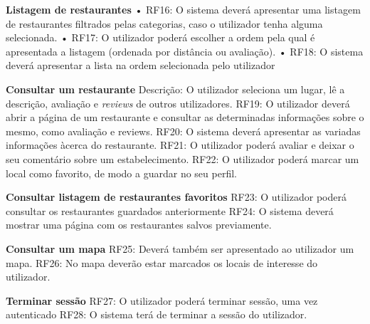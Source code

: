 \documentclass[a4paper,12pt]{scrreprt}
\begin{document}
            \textbf{Listagem de restaurantes} \newline
            • RF16: O sistema deverá apresentar uma listagem de restaurantes filtrados pelas categorias, caso o utilizador tenha alguma selecionada. \newline
            • RF17: O utilizador poderá escolher a ordem pela qual é apresentada a listagem (ordenada por distância ou avaliação).\newline
            • RF18: O sistema deverá apresentar a lista na ordem selecionada pelo utilizador
            
            \textbf{Consultar um restaurante}\newline
            Descrição: O utilizador seleciona um lugar, lê a descrição, avaliação e \textit{reviews} de outros utilizadores. \newline
            RF19: O utilizador deverá abrir a página de um restaurante e consultar as determinadas informações sobre o mesmo, como avaliação e reviews.\newline
            RF20: O sistema deverá apresentar as variadas informações àcerca do restaurante.\newline
            RF21: O utilizador poderá avaliar e deixar o seu comentário sobre um estabelecimento. \newline 
            RF22: O utilizador poderá marcar um local como favorito, de modo a guardar no seu perfil. \newline
            
           \textbf{Consultar listagem de restaurantes favoritos} \newline
            RF23: O utilizador poderá consultar os restaurantes guardados anteriormente 
            \newline
            RF24: O sistema deverá mostrar uma página com os restaurantes salvos previamente.\newline
           
           \textbf{Consultar um mapa} \newline
           RF25: Deverá também ser apresentado ao utilizador um mapa.\newline
           RF26: No mapa deverão estar marcados os locais de interesse do utilizador.\newline

            \textbf{Terminar sessão}
            RF27: O utilizador poderá terminar sessão, uma vez autenticado
            RF28: O sistema terá de terminar a sessão do utilizador.
\end{document}
